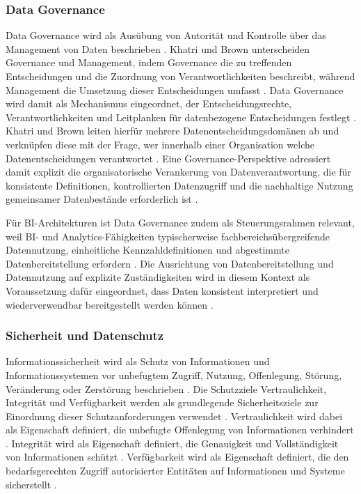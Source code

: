 \subsubsection{Data Governance}
Data Governance wird als Ausübung von Autorität und Kontrolle über das Management von Daten beschrieben \cite{KhatriBrown2010}. Khatri und Brown unterscheiden Governance und Management, indem Governance die zu treffenden Entscheidungen und die Zuordnung von Verantwortlichkeiten beschreibt, während Management die Umsetzung dieser Entscheidungen umfasst \cite{KhatriBrown2010}. Data Governance wird damit als Mechanismus eingeordnet, der Entscheidungsrechte, Verantwortlichkeiten und Leitplanken für datenbezogene Entscheidungen festlegt \cite{KhatriBrown2010}. Khatri und Brown leiten hierfür mehrere Datenentscheidungsdomänen ab und verknüpfen diese mit der Frage, wer innerhalb einer Organisation welche Datenentscheidungen verantwortet \cite{KhatriBrown2010}. Eine Governance-Perspektive adressiert damit explizit die organisatorische Verankerung von Datenverantwortung, die für konsistente Definitionen, kontrollierten Datenzugriff und die nachhaltige Nutzung gemeinsamer Datenbestände erforderlich ist \cite{KhatriBrown2010}. 

Für BI-Architekturen ist Data Governance zudem als Steuerungsrahmen relevant, weil BI- und Analytics-Fähigkeiten typischerweise fachbereichsübergreifende Datennutzung, einheitliche Kennzahldefinitionen und abgestimmte Datenbereitstellung erfordern \cite{BaarsKemper2021}. Die Ausrichtung von Datenbereitstellung und Datennutzung auf explizite Zuständigkeiten wird in diesem Kontext als Voraussetzung dafür eingeordnet, dass Daten konsistent interpretiert und wiederverwendbar bereitgestellt werden können \cite{KhatriBrown2010}. 

\subsubsection{Sicherheit und Datenschutz}
Informationssicherheit wird als Schutz von Informationen und Informationssystemen vor unbefugtem Zugriff, Nutzung, Offenlegung, Störung, Veränderung oder Zerstörung beschrieben \cite{NISTInfoSec}. Die Schutzziele Vertraulichkeit, Integrität und Verfügbarkeit werden als grundlegende Sicherheitsziele zur Einordnung dieser Schutzanforderungen verwendet \cite{NISTCIA}. Vertraulichkeit wird dabei als Eigenschaft definiert, die unbefugte Offenlegung von Informationen verhindert \cite{NISTCIA}. Integrität wird als Eigenschaft definiert, die Genauigkeit und Vollständigkeit von Informationen schützt \cite{NISTCIA}. Verfügbarkeit wird als Eigenschaft definiert, die den bedarfsgerechten Zugriff autorisierter Entitäten auf Informationen und Systeme sicherstellt \cite{NISTCIA}. 

